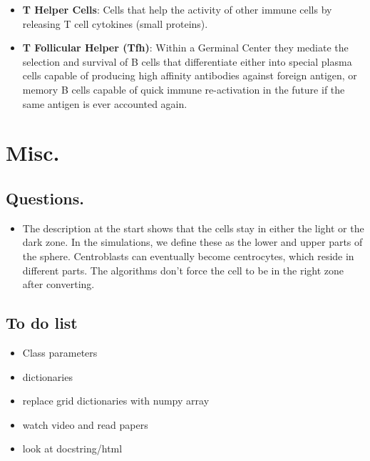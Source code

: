 \documentclass[english]{article}
\begin{document}
\begin{itemize}
\item \textbf{T Helper Cells}: Cells that help the activity of other immune cells by releasing T cell cytokines (small proteins).

\item \textbf{T Follicular Helper (Tfh)}: Within a Germinal Center they mediate the selection and survival of B cells that differentiate either into special plasma cells capable of producing high affinity antibodies against foreign antigen, or memory B cells capable of quick immune re-activation in the future if the same antigen is ever accounted again. 


\end{itemize}

\section{Misc.}
\subsection{Questions.}
\begin{itemize}

\item The description at the start shows that the cells stay in either the light or the dark zone. In the simulations, we define these as the lower and upper parts of the sphere.  Centroblasts can eventually become centrocytes, which reside in different parts. The algorithms don't force the cell to be in the right zone after converting. 


\end{itemize}

\subsection{To do list}

\begin{itemize}

\item Class parameters

\item dictionaries

\item replace grid dictionaries with numpy array

\item watch video and read papers

\item look at docstring/html

\end{itemize}
\end{document}
